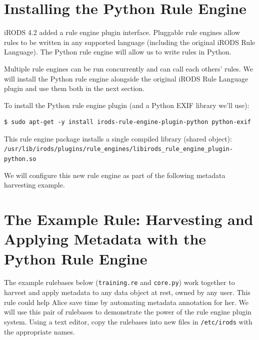 \documentclass[10pt,oneside]{memoir}
\begin{document}
\section{Installing the Python Rule Engine}

iRODS 4.2 added a rule engine plugin interface.  Pluggable rule engines allow rules to be written in any supported language (including the original iRODS Rule Language).  The Python rule engine will allow us to write rules in Python.

Multiple rule engines can be run concurrently and can call each others' rules.  We will install the Python rule engine alongside the original iRODS Rule Language plugin and use them both in the next section.

To install the Python rule engine plugin (and a Python EXIF library we'll use):

\begin{lstlisting}
$ sudo apt-get -y install irods-rule-engine-plugin-python python-exif
\end{lstlisting}

This rule engine package installs a single compiled library (shared object): \\ \texttt{/usr/lib/irods/plugins/rule\_engines/libirods\_rule\_engine\_plugin-python.so}

We will configure this new rule engine as part of the following metadata harvesting example.

\section{The Example Rule: Harvesting and Applying Metadata with the Python Rule Engine}

The example rulebases below (\texttt{training.re} and \texttt{core.py}) work together to harvest and apply metadata to any data object at rest, owned by any user. This rule could help Alice save time by automating metadata annotation for her. We will use this pair of rulebases to demonstrate the power of the rule engine plugin system. Using a text editor, copy the rulebases into new files in \texttt{/etc/irods} with the appropriate names.

\vspace{5mm}
\begin{lrbox}{\lstTrainingRuleBase}

\end{lrbox}
\href{https://raw.githubusercontent.com/irods/irods_training/ugm2019/beginner/training.re}{\usebox{\lstTrainingRuleBase}}
\end{document}
